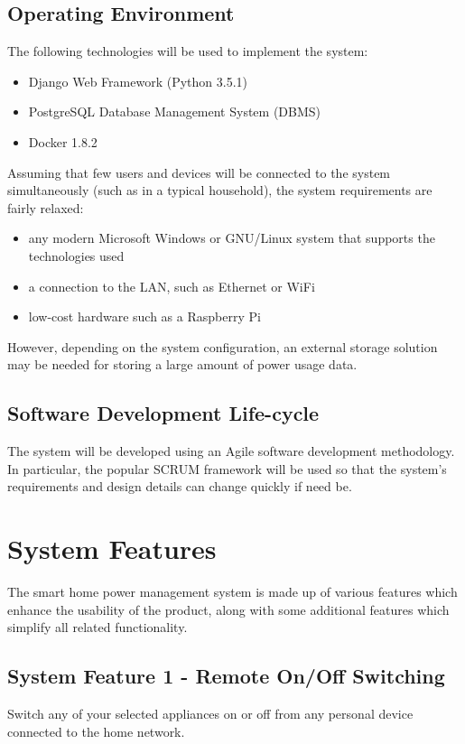 \documentclass[11pt, a4paper]{article}
\begin{document}
	\subsection{Operating Environment}
	The following technologies will be used to implement the system:
	\begin{itemize}
		\item Django Web Framework (Python 3.5.1)
		\item PostgreSQL Database Management System (DBMS)
		\item Docker 1.8.2
	\end{itemize}
	Assuming that few users and devices will be connected to the system simultaneously (such as in a typical household), the system requirements are fairly relaxed:
	\begin{itemize}
		\item any modern Microsoft Windows or GNU/Linux system that supports the technologies used
		\item a connection to the LAN, such as Ethernet or WiFi
		\item low-cost hardware such as a Raspberry Pi
	\end{itemize}
	However, depending on the system configuration, an external storage solution may be needed for storing a large amount of power usage data.
	
	
	\subsection{Software Development Life-cycle}
	The system will be developed using an Agile software development methodology. In particular, the popular SCRUM framework will be used so that the system's requirements and design details can change quickly if need be. 
	
	
	\section{System Features}
	The smart home power management system is made up of various features which enhance the usability of the product, along with some additional features which simplify all related functionality.
	\subsection{System Feature 1 - Remote On/Off Switching} 
	Switch any of your selected appliances on or off from any personal device connected to the home network. 
\end{document}
